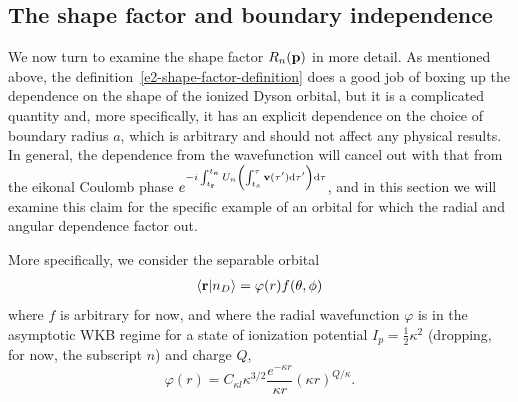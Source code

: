 \subsection{The shape factor and boundary independence}
We now turn to examine the shape factor $R_n(\vb{p})$ in more detail. As mentioned above, the definition~\eqref{e2-shape-factor-definition} does a good job of boxing up the dependence on the shape of the ionized Dyson orbital, but it is a complicated quantity and, more specifically, it has an explicit dependence on the choice of boundary radius $a$, which is arbitrary and should not affect any physical results. In general, the dependence from the wavefunction will cancel out with that from the eikonal Coulomb phase $e^{-i\int_{t_{\vb{r}}}^{t_\kappa} U_n\left(\int_{ {t_s}}^\tau \vb{v}(\tau')\mathrm{d}\tau'\right) \mathrm{d}\tau}$, and in this section we will examine this claim for the specific example of an orbital for which the radial and angular dependence factor out.

More specifically, we consider the separable orbital
\begin{align}
\braket{\vb{r}}{n_D}
= 
\varphi(r) f(\theta,\phi)
\end{align}
where $f$ is arbitrary for now, and where the radial wavefunction $\varphi$ is in the asymptotic WKB regime for a state of ionization potential $I_{p}=\frac12 \kappa^2$ (dropping, for now, the subscript $n$) and charge $Q$,
\begin{equation}
\varphi(r) 
= 
C_{\kappa l} \kappa^{3/2} \frac{e^{-\kappa r}}{\kappa r}(\kappa r)^{Q/\kappa}.
\label{e2-radial-WKB-wavefunction}
\end{equation}



